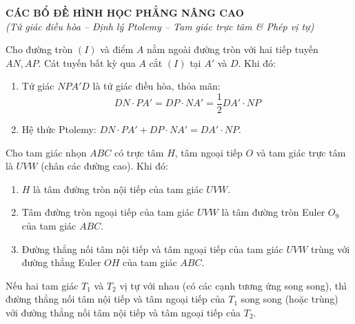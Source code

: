 \documentclass[12pt,a4paper]{article}
\begin{document}
\begin{center}
	{\Large \textbf{CÁC BỔ ĐỀ HÌNH HỌC PHẲNG NÂNG CAO}}\\[2mm]
	{\small \textit{(Tứ giác điều hòa -- Định lý Ptolemy -- Tam giác trực tâm \& Phép vị tự)}}
\end{center}
\vspace{4mm}

\begin{tcolorbox}[colback=blue!5!white,colframe=blue!75!black,title=\textbf{Bổ đề 1: Tứ giác điều hòa và Định lý Ptolemy}]
Cho đường tròn $(I)$ và điểm $A$ nằm ngoài đường tròn với hai tiếp tuyến $AN, AP$. Cát tuyến bất kỳ qua $A$ cắt $(I)$ tại $A'$ và $D$. Khi đó:
\begin{enumerate}
    \item Tứ giác $NPA'D$ là tứ giác điều hòa, thỏa mãn:
    \[
    DN \cdot PA' = DP \cdot NA' = \frac{1}{2} DA' \cdot NP
    \]
    \item Hệ thức Ptolemy: $DN \cdot PA' + DP \cdot NA' = DA' \cdot NP$.
\end{enumerate}
\end{tcolorbox}

\vspace{3mm}

\begin{tcolorbox}[colback=teal!5!white,colframe=teal!75!black,title=\textbf{Bổ đề 2: Tâm nội tiếp và Ngoại tiếp của Tam giác trực tâm}]
Cho tam giác nhọn $ABC$ có trực tâm $H$, tâm ngoại tiếp $O$ và tam giác trực tâm là $UVW$ (chân các đường cao). Khi đó:
\begin{enumerate}
    \item $H$ là tâm đường tròn nội tiếp của tam giác $UVW$.
    \item Tâm đường tròn ngoại tiếp của tam giác $UVW$ là tâm đường tròn Euler $O_9$ của tam giác $ABC$.
    \item Đường thẳng nối tâm nội tiếp và tâm ngoại tiếp của tam giác $UVW$ trùng với đường thẳng Euler $OH$ của tam giác $ABC$.
\end{enumerate}
\end{tcolorbox}

\vspace{3mm}

\begin{tcolorbox}[colback=orange!5!white,colframe=orange!75!black,title=\textbf{Bổ đề 3: Phép vị tự và Trục nối các tâm đặc biệt}]
Nếu hai tam giác $T_1$ và $T_2$ vị tự với nhau (có các cạnh tương ứng song song), thì đường thẳng nối tâm nội tiếp và tâm ngoại tiếp của $T_1$ song song (hoặc trùng) với đường thẳng nối tâm nội tiếp và tâm ngoại tiếp của $T_2$.
\end{tcolorbox}
\end{document}
